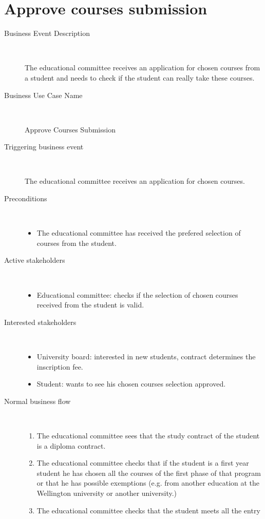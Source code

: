 \section{Approve courses submission}
\begin{description}
	\item[Business Event Description] \ 
		\par The educational committee receives an application for chosen courses from
		a student and needs to check if the student can really take these courses.
	\item[Business Use Case Name] \ 
		\par Approve Courses Submission
	\item[Triggering business event] \ 
		\par The educational committee receives an application for chosen courses.
	\item[Preconditions] \
	\begin{itemize}
		\item The educational committee has received the prefered selection of courses
		from the student.
	\end{itemize}
	\item[Active stakeholders] \ 
	\begin{itemize}
		\item Educational committee: checks if the selection of chosen courses
		received from the student is valid.
	\end{itemize}
	\item[Interested stakeholders] \ 
		\begin{itemize}
		\item University board: interested in new students, contract determines the
		inscription fee.
		\item Student: wants to see his chosen courses selection approved.
		\end{itemize}
	\item[Normal business flow] \ 
	\begin{enumerate}
	  	\item The educational committee sees that the study contract of the student
	  	is a diploma contract.
	  	\item The educational committee checks that if the student is a first year
	  	student he has chosen all the courses of the first phase of that program or
	  	that he has possible exemptions (e.g. from another education at the
	  	Wellington university or another university.)
	  	\item The educational committee checks that the student meets all the entry

\end{enumerate}
\end{description}
